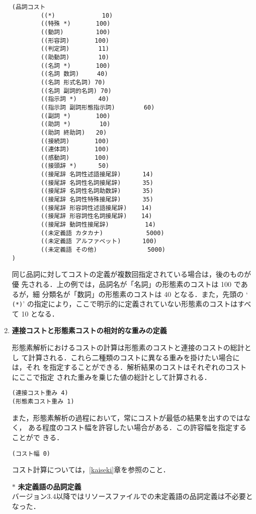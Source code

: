 \documentclass[a4j,titlepage]{jarticle}
\begin{document}
\begin{enumerate}
\begin{verbatim}
(品詞コスト
        ((*)             10)
        ((特殊 *)       100)
        ((動詞)         100)
        ((形容詞)       100)
        ((判定詞)        11)
        ((助動詞)        10)
        ((名詞 *)       100)
        ((名詞 数詞)     40)
        ((名詞 形式名詞) 70)
        ((名詞 副詞的名詞) 70)
        ((指示詞 *)      40)
        ((指示詞 副詞形態指示詞)        60)
        ((副詞 *)       100)
        ((助詞 *)        10)
        ((助詞 終助詞)   20)
        ((接続詞)       100)
        ((連体詞)       100)
        ((感動詞)       100)
        ((接頭辞 *)      50)
        ((接尾辞 名詞性述語接尾辞)      14)
        ((接尾辞 名詞性名詞接尾辞)      35)
        ((接尾辞 名詞性名詞助数辞)      35)
        ((接尾辞 名詞性特殊接尾辞)      35)
        ((接尾辞 形容詞性述語接尾辞)    14)
        ((接尾辞 形容詞性名詞接尾辞)    14)
        ((接尾辞 動詞性接尾辞)          14)
        ((未定義語 カタカナ)            5000)
        ((未定義語 アルファベット)      100)
        ((未定義語 その他)              5000)
)
\end{verbatim}

同じ品詞に対してコストの定義が複数回指定されている場合は，後のものが優
先される．上の例では，品詞名が「名詞」の形態素のコストは 100 であるが，細
分類名が「数詞」の形態素のコストは 40 となる．また，先頭の `{\tt
(*)}' の指定により，ここで明示的に定義されていない形態素のコストはすべ
て 10 となる．

\item {\bf 連接コストと形態素コストの相対的な重みの定義}

形態素解析におけるコストの計算は形態素のコストと連接のコストの総計とし
て計算される．これら二種類のコストに異なる重みを掛けたい場合には，それ
を指定することができる．解析結果のコストはそれぞれのコストにここで指定
された重みを乗じた値の総計として計算される．

\begin{verbatim}
(連接コスト重み 4)
(形態素コスト重み 1)
\end{verbatim}

また，形態素解析の過程において，常にコストが最低の結果を出すのではなく，
ある程度のコスト幅を許容したい場合がある．この許容幅を指定することがで
きる．

\begin{verbatim}
(コスト幅 0)
\end{verbatim}

コスト計算については，\ref{kaiseki}章を参照のこと．

\item[$\ast$] {\bf 未定義語の品詞定義}\\
バージョン3.4以降ではリソースファイルでの未定義語の品詞定義は不必要と
なった．
\end{enumerate}
\end{document}
